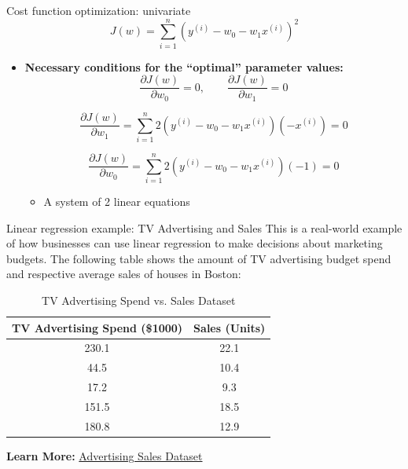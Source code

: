 \documentclass[serif, aspectratio=169]{beamer}
\begin{document}
    \begin{frame}{Cost function optimization: univariate}
        \[
            J(w) = \sum_{i=1}^{n} \left( y^{(i)} - w_0 - w_1 x^{(i)} \right)^2
        \]

        \begin{itemize}
            \item \textbf{Necessary conditions for the “optimal” parameter values:}
            \[
                \frac{\partial J(w)}{\partial w_0} = 0, \qquad
                \frac{\partial J(w)}{\partial w_1} = 0
            \]

            \[
                \frac{\partial J(w)}{\partial w_1} = \sum_{i=1}^{n} 2 \left( y^{(i)} - w_0 - w_1 x^{(i)} \right) (-x^{(i)}) = 0
            \]

            \[
                \frac{\partial J(w)}{\partial w_0} = \sum_{i=1}^{n} 2 \left( y^{(i)} - w_0 - w_1 x^{(i)} \right) (-1) = 0
            \]

            \begin{itemize}
                \item A system of 2 linear equations
            \end{itemize}
        \end{itemize}


    \end{frame}





    \begin{frame}{Linear regression example: TV Advertising and Sales}
        This is a real-world example of how businesses can use linear regression to make decisions about marketing budgets. The following table shows the amount of TV advertising budget spend and respective average sales of houses in Boston:
        \begin{table}[h!]
            \centering
            \begin{tabular}{|c|c|}
                \hline
                \textbf{TV Advertising Spend (\$1000)} & \textbf{Sales (Units)} \\ \hline
                230.1                                  & 22.1                   \\ \hline
                44.5                                   & 10.4                   \\ \hline
                17.2                                   & 9.3                    \\ \hline
                151.5                                  & 18.5                   \\ \hline
                180.8                                  & 12.9                   \\ \hline
            \end{tabular}
            \caption{TV Advertising Spend vs. Sales Dataset}
        \end{table}

        \textbf{Learn More:}
        \href{https://www.kaggle.com/datasets/yasserh/advertising-sales-dataset}{Advertising Sales Dataset}
    \end{frame}
\end{document}

